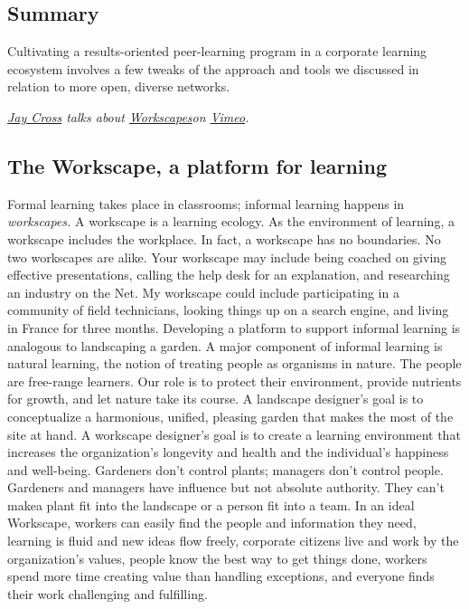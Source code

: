 \subsection{Summary}

Cultivating a results-oriented peer-learning program in a corporate
learning ecosystem involves a few tweaks of the approach and tools we
discussed in relation to more open, diverse networks.

\emph{\href{http://vimeo.com/user7021511}{Jay Cross} talks about
\emph{\href{http://vimeo.com/45989904}{Workscapes}}on
\href{http://vimeo.com}{Vimeo}.}

\subsection{The Workscape, a platform for learning}

Formal learning takes place in classrooms; informal learning happens in
\emph{workscapes.} A workscape is a learning ecology. As the environment
of learning, a workscape includes the workplace. In fact, a workscape
has no boundaries. No two workscapes are alike. Your workscape may
include being coached on giving effective presentations, calling the
help desk for an explanation, and researching an industry on the Net. My
workscape could include participating in a community of field
technicians, looking things up on a search engine, and living in France
for three months. Developing a platform to support informal learning is
analogous to landscaping a garden. A major component of informal
learning is natural learning, the notion of treating people as organisms
in nature. The people are free-range learners. Our role is to protect
their environment, provide nutrients for growth, and let nature take its
course. A landscape designer's goal is to conceptualize a harmonious,
unified, pleasing garden that makes the most of the site at hand. A
workscape designer's goal is to create a learning environment that
increases the organization's longevity and health and the individual's
happiness and well-being. Gardeners don't control plants; managers don't
control people. Gardeners and managers have influence but not absolute
authority. They can't make\emph{}a plant fit into the landscape or a
person fit into a team. In an ideal Workscape, workers can easily find
the people and information they need, learning is fluid and new ideas
flow freely, corporate citizens live and work by the organization's
values, people know the best way to get things done, workers spend more
time creating value than handling exceptions, and everyone finds their
work challenging and fulfilling.

